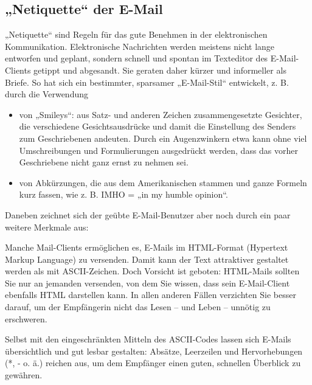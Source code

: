 \documentclass[]{book}
\providecommand{\tightlist}{%
  \setlength{\itemsep}{0pt}\setlength{\parskip}{0pt}}
\theoremstyle{definition}
\theoremstyle{definition}
\theoremstyle{definition}
\theoremstyle{remark}
\begin{document}
\subsection{„Netiquette`` der E-Mail}\label{netiquette-der-e-mail}

„Netiquette`` sind Regeln für das gute Benehmen in der elektronischen
Kommunikation. Elektronische Nachrichten werden meistens nicht lange
entworfen und geplant, sondern schnell und spontan im Texteditor des
E-Mail-Clients getippt und abgesandt. Sie geraten daher kürzer und
informeller als Briefe. So hat sich ein bestimmter, sparsamer
„E-Mail-Stil`` entwickelt, z. B. durch die Verwendung

\begin{itemize}
\tightlist
\item
  von „Smileys``: aus Satz- und anderen Zeichen zusammengesetzte
  Gesichter, die verschiedene Gesichtsausdrücke und damit die
  Einstellung des Senders zum Geschriebenen andeuten. Durch ein
  Augenzwinkern etwa kann ohne viel Umschreibungen und Formulierungen
  ausgedrückt werden, dass das vorher Geschriebene nicht ganz ernst zu
  nehmen sei.
\item
  von Abkürzungen, die aus dem Amerikanischen stammen und ganze Formeln
  kurz fassen, wie z. B. IMHO = „in my humble opinion``.
\end{itemize}

Daneben zeichnet sich der geübte E-Mail-Benutzer aber noch durch ein
paar weitere Merkmale aus:

Manche Mail-Clients ermöglichen es, E-Mails im HTML-Format (Hypertext
Markup Language) zu versenden. Damit kann der Text attraktiver gestaltet
werden als mit ASCII-Zeichen. Doch Vorsicht ist geboten: HTML-Mails
sollten Sie nur an jemanden versenden, von dem Sie wissen, dass sein
E-Mail-Client ebenfalls HTML darstellen kann. In allen anderen Fällen
verzichten Sie besser darauf, um der Empfängerin nicht das Lesen -- und
Leben -- unnötig zu erschweren.

Selbst mit den eingeschränkten Mitteln des ASCII-Codes lassen sich
E-Mails übersichtlich und gut lesbar gestalten: Absätze, Leerzeilen und
Hervorhebungen (*, - o. ä.) reichen aus, um dem Empfänger einen guten,
schnellen Überblick zu gewähren.
\end{document}
